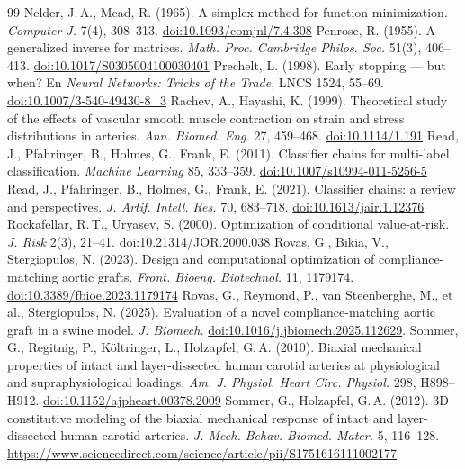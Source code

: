 \begin{thebibliography}{99}
 Nelder, J.\,A., Mead, R. (1965). A simplex method for function minimization. \emph{Computer J.} 7(4), 308--313. \href{https://doi.org/10.1093/comjnl/7.4.308}{doi:10.1093/comjnl/7.4.308}
 Penrose, R. (1955). A generalized inverse for matrices. \emph{Math. Proc. Cambridge Philos. Soc.} 51(3), 406--413. \href{https://doi.org/10.1017/S0305004100030401}{doi:10.1017/S0305004100030401}
 Prechelt, L. (1998). Early stopping --- but when? En \emph{Neural Networks: Tricks of the Trade}, LNCS 1524, 55--69. \href{https://doi.org/10.1007/3-540-49430-8_3}{doi:10.1007/3-540-49430-8\_3}
 Rachev, A., Hayashi, K. (1999). Theoretical study of the effects of vascular smooth muscle contraction on strain and stress distributions in arteries. \emph{Ann. Biomed. Eng.} 27, 459--468. \href{https://doi.org/10.1114/1.191}{doi:10.1114/1.191}
 Read, J., Pfahringer, B., Holmes, G., Frank, E. (2011). Classifier chains for multi-label classification. \emph{Machine Learning} 85, 333--359. \href{https://doi.org/10.1007/s10994-011-5256-5}{doi:10.1007/s10994-011-5256-5}
 Read, J., Pfahringer, B., Holmes, G., Frank, E. (2021). Classifier chains: a review and perspectives. \emph{J. Artif. Intell. Res.} 70, 683--718. \href{https://doi.org/10.1613/jair.1.12376}{doi:10.1613/jair.1.12376}
 Rockafellar, R.\,T., Uryasev, S. (2000). Optimization of conditional value-at-risk. \emph{J. Risk} 2(3), 21--41. \href{https://doi.org/10.21314/JOR.2000.038}{doi:10.21314/JOR.2000.038}
 Rovas, G., Bikia, V., Stergiopulos, N. (2023). Design and computational optimization of compliance-matching aortic grafts. \emph{Front. Bioeng. Biotechnol.} 11, 1179174. \href{https://doi.org/10.3389/fbioe.2023.1179174}{doi:10.3389/fbioe.2023.1179174}
 Rovas, G., Reymond, P., van Steenberghe, M., et al., Stergiopulos, N. (2025). Evaluation of a novel compliance-matching aortic graft in a swine model. \emph{J. Biomech.} \href{https://doi.org/10.1016/j.jbiomech.2025.112629}{doi:10.1016/j.jbiomech.2025.112629}.
 Sommer, G., Regitnig, P., Költringer, L., Holzapfel, G.\,A. (2010). Biaxial mechanical properties of intact and layer-dissected human carotid arteries at physiological and supraphysiological loadings. \emph{Am. J. Physiol. Heart Circ. Physiol.} 298, H898--H912. \href{https://doi.org/10.1152/ajpheart.00378.2009}{doi:10.1152/ajpheart.00378.2009}
 Sommer, G., Holzapfel, G.\,A. (2012). 3D constitutive modeling of the biaxial mechanical response of intact and layer-dissected human carotid arteries. \emph{J. Mech. Behav. Biomed. Mater.} 5, 116--128. \url{https://www.sciencedirect.com/science/article/pii/S1751616111002177}

\end{thebibliography}
